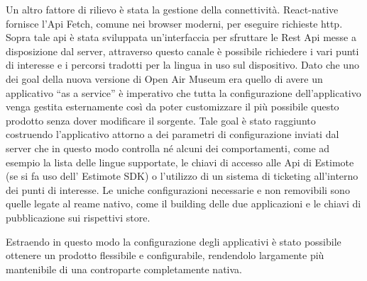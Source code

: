 Un altro fattore di rilievo è stata la gestione della connettività. React-native fornisce l’Api Fetch, comune nei browser moderni, per eseguire richieste http. Sopra tale api è stata sviluppata un'interfaccia per sfruttare le Rest Api messe a disposizione dal server, attraverso questo canale è possibile richiedere i vari punti di interesse e i percorsi tradotti per la lingua in uso sul dispositivo. Dato che uno dei goal della nuova versione di Open Air Museum era quello di avere un applicativo “as a service” è imperativo che tutta la configurazione dell’applicativo venga gestita esternamente così da poter customizzare il più possibile questo prodotto senza dover modificare il sorgente. Tale goal è stato raggiunto costruendo l’applicativo attorno a dei parametri di configurazione inviati dal server che in questo modo controlla né alcuni dei comportamenti, come ad esempio la lista delle lingue supportate, le chiavi di accesso alle Api di Estimote (se si fa uso dell’ Estimote SDK) o l’utilizzo di un sistema di ticketing all’interno dei punti di interesse. Le uniche configurazioni necessarie e non removibili sono quelle legate al reame nativo, come il building delle due applicazioni e le chiavi di pubblicazione sui rispettivi store.\vspace{5mm}

Estraendo in questo modo la configurazione degli applicativi è stato possibile ottenere un prodotto flessibile e configurabile, rendendolo largamente più mantenibile di una controparte completamente nativa.\vspace{5mm}


